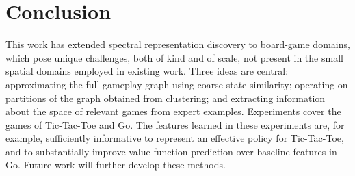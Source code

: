\section{Conclusion}

This work has extended spectral representation discovery to board-game domains,
which pose unique challenges, both of kind and of scale, not present in the
small spatial domains employed in existing work. Three ideas are central:
approximating the full gameplay graph using coarse state similarity; operating
on partitions of the graph obtained from clustering; and extracting information
about the space of relevant games from expert examples. Experiments cover the
games of Tic-Tac-Toe and Go. The features learned in these experiments are, for
example, sufficiently informative to represent an effective policy for
Tic-Tac-Toe, and to substantially improve value function prediction over
baseline features in Go. Future work will further develop these methods.

